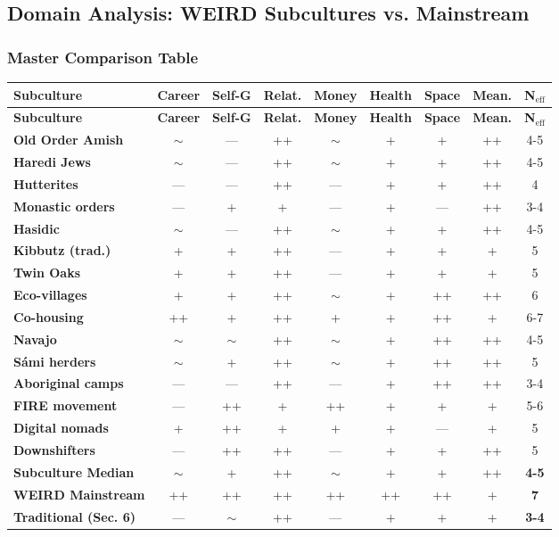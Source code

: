\subsection{Domain Analysis: WEIRD Subcultures vs. Mainstream}

\subsubsection{Master Comparison Table}

\begin{center}
\tiny
\begin{longtable}{@{}l|ccccccc|c@{}}
\toprule
\textbf{Subculture} & \textbf{Career} & \textbf{Self-G} & \textbf{Relat.} & \textbf{Money} & \textbf{Health} & \textbf{Space} & \textbf{Mean.} & \textbf{N$_{\text{eff}}$} \\
\midrule
\endfirsthead
\toprule
\textbf{Subculture} & \textbf{Career} & \textbf{Self-G} & \textbf{Relat.} & \textbf{Money} & \textbf{Health} & \textbf{Space} & \textbf{Mean.} & \textbf{N$_{\text{eff}}$} \\
\midrule
\endhead
\bottomrule
\endlastfoot
\textbf{Old Order Amish} & $\sim$ & — & ++ & $\sim$ & + & + & ++ & 4-5 \\
\textbf{Haredi Jews} & $\sim$ & — & ++ & $\sim$ & + & + & ++ & 4-5 \\
\textbf{Hutterites} & — & — & ++ & — & + & + & ++ & 4 \\
\textbf{Monastic orders} & — & + & + & — & + & — & ++ & 3-4 \\
\textbf{Hasidic} & $\sim$ & — & ++ & $\sim$ & + & + & ++ & 4-5 \\
\midrule
\textbf{Kibbutz (trad.)} & + & + & ++ & — & + & + & + & 5 \\
\textbf{Twin Oaks} & + & + & ++ & — & + & + & + & 5 \\
\textbf{Eco-villages} & + & + & ++ & $\sim$ & + & ++ & ++ & 6 \\
\textbf{Co-housing} & ++ & + & ++ & + & + & ++ & + & 6-7 \\
\midrule
\textbf{Navajo} & $\sim$ & $\sim$ & ++ & $\sim$ & + & ++ & ++ & 4-5 \\
\textbf{Sámi herders} & $\sim$ & + & ++ & $\sim$ & + & ++ & ++ & 5 \\
\textbf{Aboriginal camps} & — & — & ++ & — & + & ++ & ++ & 3-4 \\
\midrule
\textbf{FIRE movement} & — & ++ & + & ++ & + & + & + & 5-6 \\
\textbf{Digital nomads} & + & ++ & + & + & + & — & + & 5 \\
\textbf{Downshifters} & — & ++ & ++ & — & + & + & ++ & 5 \\
\midrule
\midrule
\textbf{Subculture Median} & $\sim$ & + & ++ & $\sim$ & + & + & ++ & \textbf{4-5} \\
\textbf{WEIRD Mainstream} & ++ & ++ & ++ & ++ & ++ & ++ & + & \textbf{7} \\
\textbf{Traditional (Sec. 6)} & — & $\sim$ & ++ & — & + & + & + & \textbf{3-4} \\
\end{longtable}
\end{center}

